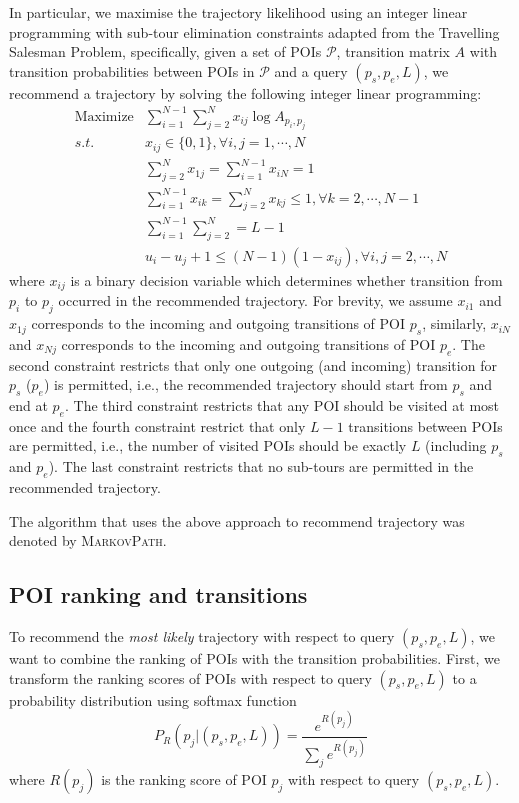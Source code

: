 In particular, we maximise the trajectory likelihood using an integer linear programming with
sub-tour elimination constraints adapted from the Travelling Salesman Problem\cite{opt98},
specifically, given a set of POIs $\mathcal{P}$, transition matrix $A$ with transition probabilities
between POIs in $\mathcal{P}$ and a query $(p_s, p_e, L)$,
we recommend a trajectory by solving the following integer linear programming:
\begin{align*}
\text{Maximize} & \sum_{i=1}^{N-1} \sum_{j=2}^N x_{ij} \log A_{p_i, p_j} \\
s.t. & x_{ij} \in \{0, 1\}, \forall i, j = 1, \cdots, N \\
     & \sum_{j=2}^N x_{1j} = \sum_{i=1}^{N-1} x_{iN} = 1 \\
     & \sum_{i=1}^{N-1} x_{ik} = \sum_{j=2}^N x_{kj} \le 1, \forall k=2, \cdots, N-1 \\
     & \sum_{i=1}^{N-1} \sum_{j=2}^N = L-1 \\
     & u_i - u_j + 1 \le (N-1) (1-x_{ij}), \forall i, j = 2, \cdots, N
\end{align*}
where $x_{ij}$ is a binary decision variable which determines whether transition from $p_i$ to $p_j$
occurred in the recommended trajectory.
For brevity, we assume $x_{i1}$ and $x_{1j}$ corresponds to the incoming and outgoing transitions of POI $p_s$,
similarly, $x_{iN}$ and $x_{Nj}$ corresponds to the incoming and outgoing transitions of POI $p_e$.
The second constraint restricts that only one outgoing (and incoming) transition for $p_s$ ($p_e$)
is permitted, i.e., the recommended trajectory should start from $p_s$ and end at $p_e$.
The third constraint restricts that any POI should be visited at most once and the fourth constraint
restrict that only $L-1$ transitions between POIs are permitted, i.e., the number of visited POIs should be
exactly $L$ (including $p_s$ and $p_e$).
The last constraint restricts that no sub-tours are permitted in the recommended trajectory.

The algorithm that uses the above approach to recommend trajectory was denoted by \textsc{MarkovPath}.


\subsection{POI ranking and transitions}
To recommend the \textit{most likely} trajectory with respect to query $(p_s, p_e, L)$,
we want to combine the ranking of POIs with the transition probabilities.
First, we transform the ranking scores of POIs with respect to query $(p_s, p_e, L)$
to a probability distribution using softmax function
\begin{displaymath}
    P_R(p_j |(p_s, p_e, L)) = \frac{e^{R(p_j)}}{\sum_j e^{R(p_j)}}
\end{displaymath}
where $R(p_j)$ is the ranking score of POI $p_j$ with respect to query $(p_s, p_e, L)$.

